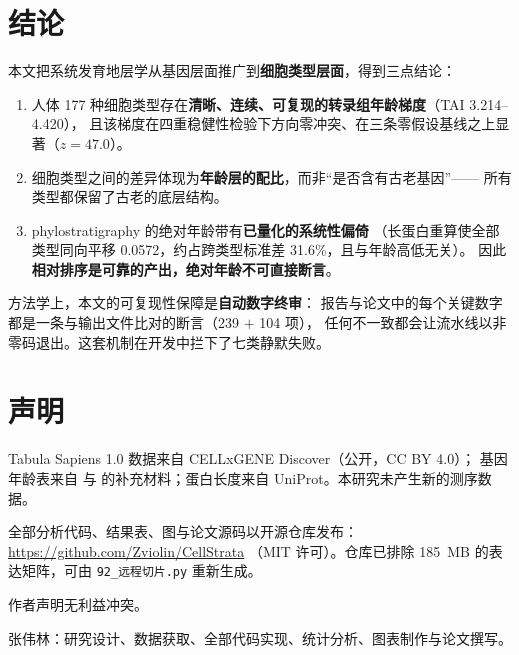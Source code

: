 \documentclass[numsec,webpdf,modern,large]{oup-authoring-template}
\newcommand{\tai}{\textrm{TAI}}
\newcommand{\code}[1]{\texttt{\small #1}}
\begin{document}
\section{结论}

本文把系统发育地层学从基因层面推广到\textbf{细胞类型层面}，得到三点结论：

\begin{enumerate}[label=(\arabic*)]
  \item 人体 177 种细胞类型存在\textbf{清晰、连续、可复现的转录组年龄梯度}（\tai{} 3.214--4.420），
        且该梯度在四重稳健性检验下方向零冲突、在三条零假设基线之上显著（$z = 47.0$）。
  \item 细胞类型之间的差异体现为\textbf{年龄层的配比}，而非“是否含有古老基因”——
        所有类型都保留了古老的底层结构。
  \item phylostratigraphy 的绝对年龄带有\textbf{已量化的系统性偏倚}
        （长蛋白重算使全部类型同向平移 0.0572，约占跨类型标准差 31.6\%，且与年龄高低无关）。
        因此\textbf{相对排序是可靠的产出，绝对年龄不可直接断言}。
\end{enumerate}

方法学上，本文的可复现性保障是\textbf{自动数字终审}：
报告与论文中的每个关键数字都是一条与输出文件比对的断言（239 $+$ 104 项），
任何不一致都会让流水线以非零码退出。这套机制在开发中拦下了七类静默失败。

\section*{声明}
Tabula Sapiens 1.0 数据来自 CELLxGENE Discover（公开，CC BY 4.0）\citep{conservation2020}；
基因年龄表来自 \citet{trigos2017} 与 \citet{liebeskind2016}
的补充材料；蛋白长度来自 UniProt。本研究未产生新的测序数据。

\vspace{0.35em}
全部分析代码、结果表、图与论文源码以开源仓库发布：\url{https://github.com/Zviolin/CellStrata}
（MIT 许可）。仓库已排除 185~MB 的表达矩阵，可由 \code{92\_远程切片.py} 重新生成。

\vspace{0.35em}
作者声明无利益冲突。

\vspace{0.35em}
张伟林：研究设计、数据获取、全部代码实现、统计分析、图表制作与论文撰写。
\end{document}

